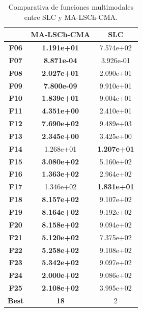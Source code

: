 \begin{table}
	\centering
	\begin{tabular}{ccc}
		\toprule
		{} & \textbf{MA-LSCh-CMA} &        \textbf{SLC} \\
		\midrule
		\textbf{F06}  &   \textbf{1.191e+01} &  7.574e+02 \\
		\textbf{F07}  &   \textbf{8.871e-04} &  3.926e-01 \\
		\textbf{F08}  &   \textbf{2.027e+01} &  2.090e+01 \\
		\textbf{F09}  &   \textbf{7.800e-09} &  9.910e+01 \\
		\textbf{F10}  &   \textbf{1.839e+01} &  9.004e+01 \\
		\textbf{F11}  &   \textbf{4.351e+00} &  2.410e+01 \\
		\textbf{F12}  &   \textbf{7.690e+02} &  9.489e+03 \\
		\textbf{F13}  &   \textbf{2.345e+00} &  3.425e+00 \\
		\textbf{F14}  &   1.268e+01 &  \textbf{1.207e+01} \\
		\textbf{F15}  &   \textbf{3.080e+02} &  5.160e+02 \\
		\textbf{F16}  &   \textbf{1.363e+02} &  2.964e+02 \\
		\textbf{F17}  &   1.346e+02 &  \textbf{1.831e+01} \\
		\textbf{F18}  &   \textbf{8.157e+02} &  9.107e+02 \\
		\textbf{F19}  &   \textbf{8.164e+02} &  9.192e+02 \\
		\textbf{F20}  &   \textbf{8.158e+02} &  9.094e+02 \\
		\textbf{F21}  &   \textbf{5.120e+02} &  7.375e+02 \\
		\textbf{F22}  &   \textbf{5.258e+02} &  9.108e+02 \\
		\textbf{F23}  &   \textbf{5.342e+02} &  9.097e+02 \\
		\textbf{F24}  &   \textbf{2.000e+02} &  9.086e+02 \\
		\textbf{F25}  &   \textbf{2.108e+02} &  3.995e+02 \\
		\midrule
		\textbf{Best} &          \textbf{18} &          2 \\
		\bottomrule
	\end{tabular}
	\caption{Comparativa de funciones multimodales entre SLC y MA-LSCh-CMA.}\label{t:comparativa-slc}
\end{table}